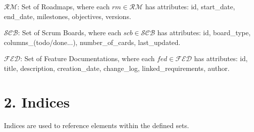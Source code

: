 \documentclass[12pt]{article}
\begin{document}
    \item $ \mathcal{RM} $: Set of Roadmaps, where each $ rm \in \mathcal{RM} $ has attributes: id, start\_date, end\_date, milestones, objectives, versions.
    \item $ \mathcal{SCB} $: Set of Scrum Boards, where each $ scb \in \mathcal{SCB} $ has attributes: id, board\_type, columns\_(todo/done...), number\_of\_cards, last\_updated.
    \item $ \mathcal{FED} $: Set of Feature Documentations, where each $ fed \in \mathcal{FED} $ has attributes: id, title, description, creation\_date, change\_log, linked\_requirements, author.

\section{2. Indices}

Indices are used to reference elements within the defined sets.
\end{document}
